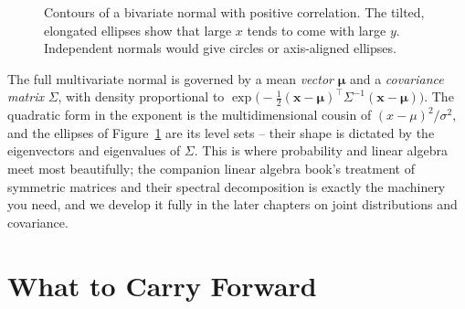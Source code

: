\begin{figure}[H]
\centering
{}
\caption{Contours of a bivariate normal with positive correlation. The tilted,
elongated ellipses show that large $x$ tends to come with large $y$. Independent
normals would give circles or axis-aligned ellipses.}
\label{ch12:fig-bivariate}
\end{figure}

\begin{connectionbox}
The full multivariate normal is governed by a mean \emph{vector} $\boldsymbol\mu$
and a \emph{covariance matrix} $\Sigma$, with density proportional to
$\exp\!\big(-\tfrac12 (\mathbf{x}-\boldsymbol\mu)^\top \Sigma^{-1}(\mathbf{x}-\boldsymbol\mu)\big)$.
The quadratic form in the exponent is the multidimensional cousin of
$(x-\mu)^2/\sigma^2$, and the ellipses of Figure~\ref{ch12:fig-bivariate} are its
level sets -- their shape is dictated by the eigenvectors and eigenvalues of
$\Sigma$. This is where probability and linear algebra meet most beautifully; the
companion linear algebra book's treatment of symmetric matrices and their spectral
decomposition is exactly the machinery you need, and we develop it fully in the
later chapters on joint distributions and covariance.
\end{connectionbox}

\section{What to Carry Forward}
\label{ch12:summary}

